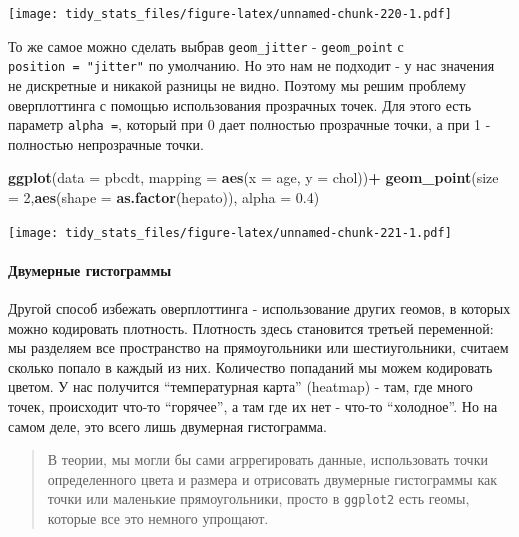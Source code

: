 \documentclass[]{book}
\newenvironment{Shaded}{\begin{snugshade}}{\end{snugshade}}
\newcommand{\KeywordTok}[1]{\textcolor[rgb]{0.13,0.29,0.53}{\textbf{#1}}}
\newcommand{\DataTypeTok}[1]{\textcolor[rgb]{0.13,0.29,0.53}{#1}}
\newcommand{\DecValTok}[1]{\textcolor[rgb]{0.00,0.00,0.81}{#1}}
\newcommand{\FloatTok}[1]{\textcolor[rgb]{0.00,0.00,0.81}{#1}}
\newcommand{\StringTok}[1]{\textcolor[rgb]{0.31,0.60,0.02}{#1}}
\newcommand{\OperatorTok}[1]{\textcolor[rgb]{0.81,0.36,0.00}{\textbf{#1}}}
\newcommand{\NormalTok}[1]{#1}
\let\oldparagraph\paragraph
\renewcommand{\paragraph}[1]{\oldparagraph{#1}\mbox{}}
\begin{document}
\texttt{[image: tidy\_stats\_files/figure-latex/unnamed-chunk-220-1.pdf]}

То же самое можно сделать выбрав \texttt{geom\_jitter} -
\texttt{geom\_point} с \texttt{position\ =\ "jitter"} по умолчанию. Но
это нам не подходит - у нас значения не дискретные и никакой разницы не
видно. Поэтому мы решим проблему оверплоттинга с помощью использования
прозрачных точек. Для этого есть параметр \texttt{alpha\ =}, который при
0 дает полностью прозрачные точки, а при 1 - полностью непрозрачные
точки.

\begin{Shaded}
\begin{Highlighting}[]
\KeywordTok{ggplot}\NormalTok{(}\DataTypeTok{data =}\NormalTok{ pbcdt, }\DataTypeTok{mapping =} \KeywordTok{aes}\NormalTok{(}\DataTypeTok{x =}\NormalTok{ age, }\DataTypeTok{y =}\NormalTok{ chol))}\OperatorTok{+}
\StringTok{  }\KeywordTok{geom_point}\NormalTok{(}\DataTypeTok{size =} \DecValTok{2}\NormalTok{,}\KeywordTok{aes}\NormalTok{(}\DataTypeTok{shape =} \KeywordTok{as.factor}\NormalTok{(hepato)), }\DataTypeTok{alpha =} \FloatTok{0.4}\NormalTok{)}
\end{Highlighting}
\end{Shaded}

\texttt{[image: tidy\_stats\_files/figure-latex/unnamed-chunk-221-1.pdf]}

\paragraph{Двумерные
гистограммы}\label{ux434ux432ux443ux43cux435ux440ux43dux44bux435-ux433ux438ux441ux442ux43eux433ux440ux430ux43cux43cux44b}

Другой способ избежать оверплоттинга - использование других геомов, в
которых можно кодировать плотность. Плотность здесь становится третьей
переменной: мы разделяем все пространство на прямоугольники или
шестиугольники, считаем сколько попало в каждый из них. Количество
попаданий мы можем кодировать цветом. У нас получится ``температурная
карта'' (heatmap) - там, где много точек, происходит что-то ``горячее'',
а там где их нет - что-то ``холодное''. Но на самом деле, это всего лишь
двумерная гистограмма.

\begin{quote}
В теории, мы могли бы сами агррегировать данные, использовать точки
определенного цвета и размера и отрисовать двумерные гистограммы как
точки или маленькие прямоугольники, просто в \texttt{ggplot2} есть
геомы, которые все это немного упрощают.
\end{quote}
\end{document}
